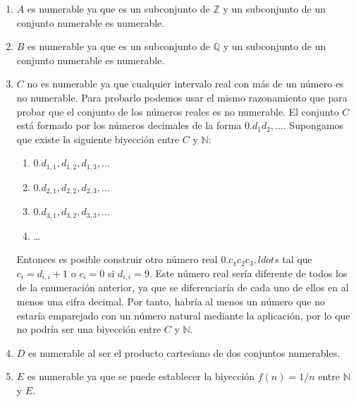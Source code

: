 \documentclass[
  spanish,
  a4paper,
]{scrreport}
\providecommand{\tightlist}{%
  \setlength{\itemsep}{0pt}\setlength{\parskip}{0pt}}
\theoremstyle{definition}
\theoremstyle{remark}
\begin{document}
\begin{tcolorbox}[enhanced jigsaw, arc=.35mm, bottomrule=.15mm, bottomtitle=1mm, breakable, colback=white, colbacktitle=quarto-callout-tip-color!10!white, colframe=quarto-callout-tip-color-frame, coltitle=black, left=2mm, leftrule=.75mm, opacityback=0, opacitybacktitle=0.6, rightrule=.15mm, title=\textcolor{quarto-callout-tip-color}{\faLightbulb}\hspace{0.5em}{Solución}, titlerule=0mm, toprule=.15mm, toptitle=1mm]

\begin{enumerate}
\def\labelenumi{\alph{enumi}.}
\item
  \(A\) es numerable ya que es un subconjunto de \(\mathbb{Z}\) y un
  subconjunto de un conjunto numerable es numerable.
\item
  \(B\) es numerable ya que es un subconjunto de \(\mathbb{Q}\) y un
  subconjunto de un conjunto numerable es numerable.
\item
  \(C\) no es numerable ya que cualquier intervalo real con más de un
  número es no numerable. Para probarlo podemos usar el mismo
  razonamiento que para probar que el conjunto de los números reales es
  no numerable. El conjunto \(C\) está formado por los números decimales
  de la forma \(0.d_1d_2,\ldots\). Supongamos que existe la siguiente
  biyección entre \(C\) y \(\mathbb{N}\):

  \begin{enumerate}
  \def\labelenumii{\arabic{enumii}.}
  \tightlist
  \item
    \(0.d_{1,1},d_{1,2},d_{1,3},\ldots\)
  \item
    \(0.d_{2,1},d_{2,2},d_{2,3},\ldots\)
  \item
    \(0.d_{3,1},d_{3,2},d_{3,3},\ldots\)
  \item
    \ldots
  \end{enumerate}

  Entonces es posible construir otro número real \(0.c_1c_2c_3,ldots\)
  tal que \(c_i=d_{i,i}+1\) o \(c_i=0\) si \(d_{i,i}=9\). Este número
  real sería diferente de todos los de la enumeración anterior, ya que
  se diferenciaría de cada uno de ellos en al menos una cifra decimal.
  Por tanto, habría al menos un número que no estaría emparejado con un
  número natural mediante la aplicación, por lo que no podría ser una
  biyección entre \(C\) y \(\mathbb{N}\).
\item
  \(D\) es numerable al ser el producto cartesiano de dos conjuntos
  numerables.
\item
  \(E\) es numerable ya que se puede establecer la biyección
  \(f(n) = 1/n\) entre \(\mathbb{N}\) y \(E\).
\end{enumerate}

\end{tcolorbox}
\end{document}
